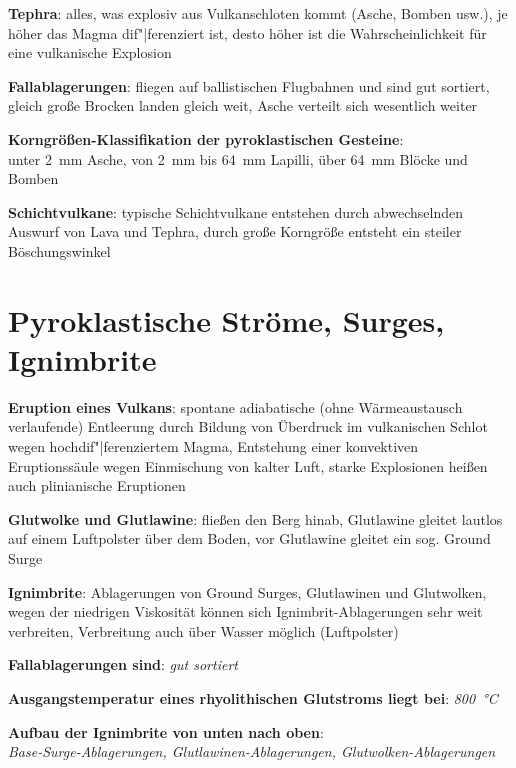 \textbf{Tephra}:
alles, was explosiv aus Vulkanschloten kommt (Asche, Bomben usw.),
je höher das Magma dif"|ferenziert ist, desto höher ist die Wahrscheinlichkeit für eine
vulkanische Explosion

\textbf{Fallablagerungen}:
fliegen auf ballistischen Flugbahnen und sind gut sortiert,
gleich große Brocken landen gleich weit,
Asche verteilt sich wesentlich weiter

\textbf{Korngrößen-Klassifikation der pyroklastischen Gesteine}:\\
unter \SI{2}{\milli\meter} Asche,
von \SI{2}{\milli\meter} bis \SI{64}{\milli\meter} Lapilli,
über \SI{64}{\milli\meter} Blöcke und Bomben

\textbf{Schichtvulkane}:
typische Schichtvulkane entstehen durch abwechselnden Auswurf von Lava und Tephra,
durch große Korngröße entsteht ein steiler Böschungswinkel

\pagebreak

\section{%
    Pyroklastische Ströme, Surges, Ignimbrite%
}

\textbf{Eruption eines Vulkans}:
spontane adiabatische (ohne Wärmeaustausch verlaufende) Entleerung durch
Bildung von Überdruck im vulkanischen Schlot wegen hochdif"|ferenziertem Magma,
Entstehung einer konvektiven Eruptionssäule wegen Einmischung von kalter Luft,
starke Explosionen heißen auch plinianische Eruptionen

\textbf{Glutwolke und Glutlawine}:
fließen den Berg hinab,
Glutlawine gleitet lautlos auf einem Luftpolster über dem Boden,
vor Glutlawine gleitet ein sog. Ground Surge

\textbf{Ignimbrite}:
Ablagerungen von Ground Surges, Glutlawinen und Glutwolken,
wegen der niedrigen Viskosität können sich Ignimbrit-Ablagerungen sehr weit verbreiten,
Verbreitung auch über Wasser möglich (Luftpolster)

\begin{wichtig}
    \item
    \textbf{Fallablagerungen sind}:
    \emph{gut sortiert}

    \item
    \textbf{Ausgangstemperatur eines rhyolithischen Glutstroms liegt bei}:
    \emph{\SI[math-rm=\mathit,text-rm=\itshape]{800}{\celsius}}

    \item
    \textbf{Aufbau der Ignimbrite von unten nach oben}:\\
    \emph{Base-Surge-Ablagerungen, Glutlawinen-Ablagerungen, Glutwolken-Ablagerungen}
\end{wichtig}

